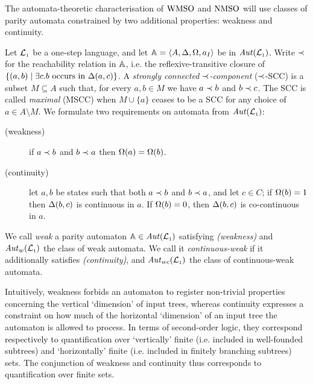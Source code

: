
The automata-theoretic characterisation of $\mathrm{WMSO}$ and $\mathrm{NMSO}$ will use classes of parity automata constrained by two additional properties: weakness
and continuity. 

\begin{definition}%
\label{def:weak}
Let $\mathcal{L}_{\scriptscriptstyle 1}$ be a one-step language, and let $\mathbb{A} = \langle{A,\Delta,\Omega,a_I}\rangle$
be in $\mathit{Aut}(\mathcal{L}_{\scriptscriptstyle 1})$. Write $\prec$ for the reachability relation in $\mathbb{A}$, i.e. the reflexive-transitive closure of $\{ (a,b) \mid \exists c. b \text{ occurs in }\tmap(a,c)\}$. A \emph{strongly connected $\prec$-component} ($\prec$-SCC) is a subset $M\subseteq A$ such that, for every $a,b \in M$ we have $a \prec b$ and $b \prec c$. The SCC is called \emph{maximal} (MSCC) when $M\cup\{a\}$ ceases to be a SCC for any choice of $a \in A\setminus M$.
We formulate two requirements on automata from $\mathit{Aut}(\mathcal{L}_{\scriptscriptstyle 1})$:
\begin{description}
\item[(weakness)] if $a \prec b$ and $b \prec a$ then $\Omega(a) = \Omega(b)$.
\item[(continuity)] let $a,b$ be states such that both $a\prec b$ and
$b \prec a$, and let $c\in C$;
    if ${\Omega(b)}=1$ then $\Delta(b,c)$ is continuous in $a$.
    If $\Omega(b)=0$, then $\Delta(b,c)$ is co-continuous in $a$.
\end{description}
We call \emph{weak} a parity automaton $\mathbb{A} \in \mathit{Aut}(\mathcal{L}_{\scriptscriptstyle 1})$ satisfying \emph{(weakness)} and $\mathit{Aut}_{w}(\mathcal{L}_{\scriptscriptstyle 1})$ the class of weak automata. We call it \emph{continuous-weak} if it additionally satisfies \emph{(continuity)}, and $\mathit{Aut}_{wc}(\mathcal{L}_{\scriptscriptstyle 1})$ the class of continuous-weak automata.
\end{definition}


Intuitively, weakness forbids an automaton to register non-trivial properties concerning the vertical `dimension' of input trees, whereas continuity expresses a constraint on how much of the horizontal `dimension' of an input tree the automaton is allowed to process. In terms of second-order logic, they correspond respectively to quantification over `vertically' finite (i.e. included in well-founded subtrees) and `horizontally' finite (i.e. included in finitely branching subtrees) sets. The conjunction of weakness and continuity thus corresponds to quantification over finite sets. 


